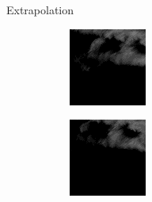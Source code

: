 \documentclass{beamer}
\begin{document}
\begin{frame}{Extrapolation}
	\begin{figure}
	    \begin{subfigure}{.3\textwidth}
	        \centering
	        \begin{mdframed}[style=red,nobreak=true,align=center]
	        \includegraphics[width=\linewidth]{fig/extra/3.png}
	        \end{mdframed}
	    \end{subfigure}
	    \begin{subfigure}{.3\textwidth}
	        \centering
	        \includegraphics[width=\linewidth]{fig/extra/4.png}

\end{subfigure}
\end{figure}
\end{frame}
\end{document}
